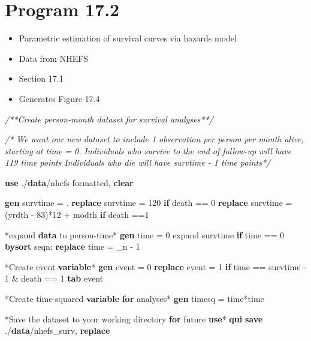 \documentclass[
  10pt,
]{book}
\newenvironment{Shaded}{\begin{snugshade}}{\end{snugshade}}
\newcommand{\CommentTok}[1]{\textcolor[rgb]{0.56,0.35,0.01}{\textit{#1}}}
\newcommand{\DataTypeTok}[1]{\textcolor[rgb]{0.13,0.29,0.53}{#1}}
\newcommand{\KeywordTok}[1]{\textcolor[rgb]{0.13,0.29,0.53}{\textbf{#1}}}
\newcommand{\NormalTok}[1]{#1}
\providecommand{\tightlist}{%
  \setlength{\itemsep}{0pt}\setlength{\parskip}{0pt}}
\begin{document}
\hypertarget{program-17.2-1}{%
\section{Program 17.2}\label{program-17.2-1}}

\begin{itemize}
\tightlist
\item
  Parametric estimation of survival curves via hazards model
\item
  Data from NHEFS
\item
  Section 17.1
\item
  Generates Figure 17.4
\end{itemize}

\begin{Shaded}
\begin{Highlighting}[]
\CommentTok{/**Create person{-}month dataset for survival analyses**/}

\CommentTok{/* We want our new dataset to include 1 observation per person }
\CommentTok{per month alive, starting at time = 0.}
\CommentTok{Individuals who survive to the end of follow{-}up will have }
\CommentTok{119 time points}
\CommentTok{Individuals who die will have survtime {-} 1 time points*/}

\KeywordTok{use}\NormalTok{ ./}\KeywordTok{data}\NormalTok{/nhefs{-}formatted, }\KeywordTok{clear}

\KeywordTok{gen}\NormalTok{ survtime = .}
\KeywordTok{replace}\NormalTok{ survtime = 120 }\KeywordTok{if}\NormalTok{ death == 0}
\KeywordTok{replace}\NormalTok{ survtime = (yrdth {-} 83)*12 + modth }\KeywordTok{if}\NormalTok{ death ==1}

\NormalTok{*expand }\KeywordTok{data}\NormalTok{ to person{-}time*}
\KeywordTok{gen}\NormalTok{ time = 0}
\NormalTok{expand survtime }\KeywordTok{if}\NormalTok{ time == 0}
\KeywordTok{bysort}\NormalTok{ seqn: }\KeywordTok{replace}\NormalTok{ time = }\DataTypeTok{\_n}\NormalTok{ {-} 1}

\NormalTok{*Create event }\KeywordTok{variable}\NormalTok{*}
\KeywordTok{gen}\NormalTok{ event = 0}
\KeywordTok{replace}\NormalTok{ event = 1 }\KeywordTok{if}\NormalTok{ time == survtime {-} 1 \& death == 1}
\KeywordTok{tab}\NormalTok{ event}

\NormalTok{*Create time{-}squared }\KeywordTok{variable} \KeywordTok{for}\NormalTok{ analyses*}
\KeywordTok{gen}\NormalTok{ timesq = time*time}

\NormalTok{*Save the dataset to your working directory }\KeywordTok{for}\NormalTok{ future }\KeywordTok{use}\NormalTok{*}
\KeywordTok{qui} \KeywordTok{save}\NormalTok{ ./}\KeywordTok{data}\NormalTok{/nhefs\_surv, }\KeywordTok{replace}


\end{Highlighting}
\end{Shaded}
\end{document}
